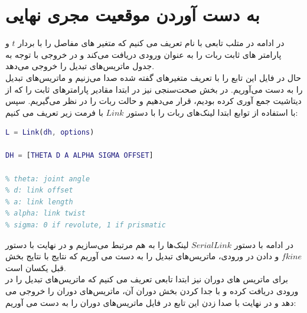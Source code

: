 \documentclass{article}
\begin{document}
\section{به دست آوردن موقعیت مجری نهایی}
در ادامه در متلب تابعی با نام  تعریف می کنیم که متغیر های مفاصل را با بردار $t$ و پارامتر های ثابت ربات را به عنوان ورودی دریافت می‌کند و در خروجی با توجه به جدول   ماتریس‌های تبدیل را خروجی می‌دهد.
\\
حال در فایل  این تابع را با تعریف متغیر‌های گفته شده صدا می‌زنیم و ماتریس‌های تبدیل را به دست می‌آوریم. در بخش صحت‌سنجی نیز در ابتدا مقادیر پارامتر‌های ثابت را که از دیتاشیت جمع آوری کرده بودیم، قرار می‌دهیم و حالت  ربات را در نظر می‌گیریم.
سپس با استفاده از توابع   ابتدا لینک‌های ربات را با دستور $Link$ با فرمت زیر تعریف می کنیم:
\begin{latin}
\begin{lstlisting}[language=matlab, caption=Peter Corke's Link, label=code:s1]
L = Link(dh, options)

DH = [THETA D A ALPHA SIGMA OFFSET]

% theta: joint angle
% d: link offset
% a: link length
% alpha: link twist
% sigma: 0 if revolute, 1 if prismatic
\end{lstlisting}
\end{latin}
\noindent
در ادامه با دستور $SerialLink$ لینک‌ها را به هم مرتبط می‌سازیم و در نهایت با دستور $fkine$ و دادن   در ورودی، ماتریس‌های تبدیل را به دست می آوریم که نتایج با نتایج بخش قبل یکسان است.
\\
برای ماتریس های دوران نیز ابتدا تابعی تعریف می کنیم  که ماتریس‌های تبدیل را در ورودی دریافت کرده و با جدا کردن بخش دوران آن، ماتریس‌های دوران را خروجی می دهد و در نهایت با صدا زدن این تابع در فایل  ماتریس‌های دوران را به دست می آوریم:

\begin{latin}
%
\end{latin}
\end{document}
